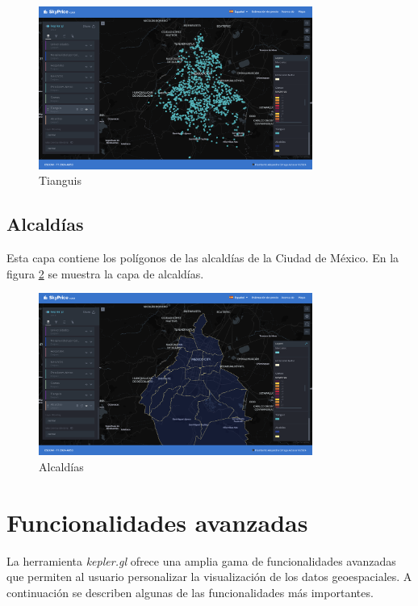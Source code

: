 \begin{figure}[H]
    \centering
    \includegraphics[width=0.8\textwidth]{imagenes/05-mapa-interactivo/tianguis.png}
    \caption{Tianguis}
    \label{fig:tianguis}
\end{figure}

\subsection{Alcaldías}
Esta capa contiene los polígonos de las alcaldías de la Ciudad de México. En la figura
\ref{fig:alcaldias} se muestra la capa de alcaldías.

\begin{figure}[H]
    \centering
    \includegraphics[width=0.8\textwidth]{imagenes/05-mapa-interactivo/alcaldias.png}
    \caption{Alcaldías}
    \label{fig:alcaldias}
\end{figure}


\section{Funcionalidades avanzadas}
La herramienta \textit{kepler.gl} ofrece una amplia gama de funcionalidades
avanzadas que permiten al usuario personalizar la visualización de los datos
geoespaciales. A continuación se describen algunas de las funcionalidades más
importantes.

